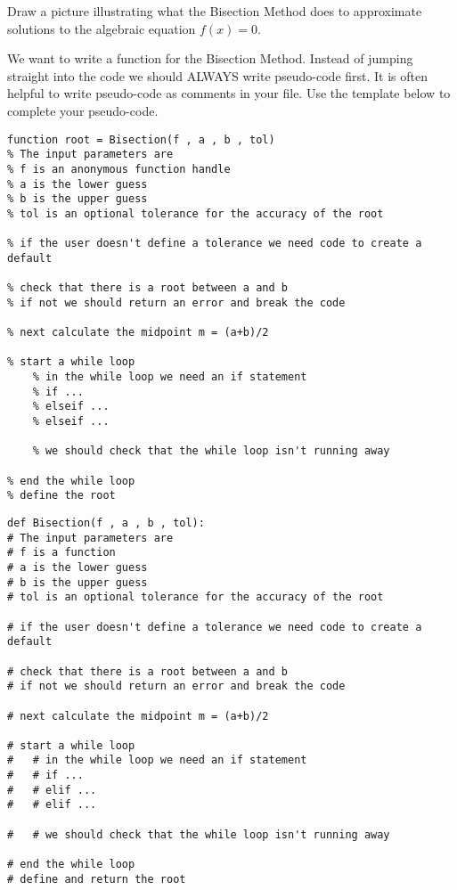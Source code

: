 \begin{problem}
    Draw a picture illustrating what the Bisection Method does to approximate solutions to
    the algebraic equation $f(x) = 0$.
\end{problem}


\begin{problem}
    We want to write a \ProgLang function for the Bisection Method.  Instead of jumping
    straight into the code we should ALWAYS write pseudo-code first.  It is often helpful
    to write pseudo-code as comments in your \ProgLang file.  Use the template below to
    complete your pseudo-code.
    \ifnum{}
\begin{lstlisting}
function root = Bisection(f , a , b , tol)
% The input parameters are
% f is an anonymous function handle
% a is the lower guess
% b is the upper guess
% tol is an optional tolerance for the accuracy of the root

% if the user doesn't define a tolerance we need code to create a default

% check that there is a root between a and b
% if not we should return an error and break the code

% next calculate the midpoint m = (a+b)/2

% start a while loop
    % in the while loop we need an if statement
    % if ...
    % elseif ...
    % elseif ...

    % we should check that the while loop isn't running away

% end the while loop
% define the root
\end{lstlisting}
\else
\begin{lstlisting}
def Bisection(f , a , b , tol):
# The input parameters are
# f is a function
# a is the lower guess
# b is the upper guess
# tol is an optional tolerance for the accuracy of the root

# if the user doesn't define a tolerance we need code to create a default

# check that there is a root between a and b
# if not we should return an error and break the code

# next calculate the midpoint m = (a+b)/2

# start a while loop
#   # in the while loop we need an if statement
#   # if ...
#   # elif ...
#   # elif ...

#   # we should check that the while loop isn't running away

# end the while loop
# define and return the root
\end{lstlisting}
\fi
\end{problem}


